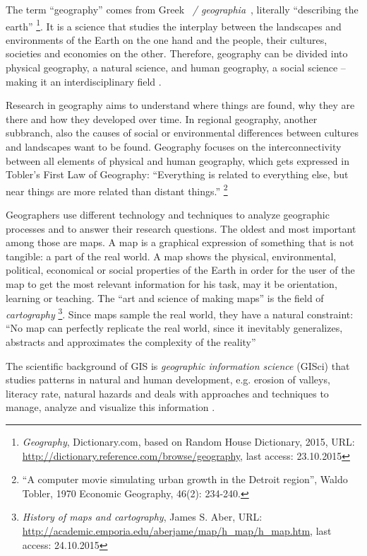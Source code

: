 The term ``geography'' comes from Greek ~\emph{\textgamma\textepsilon\textomega\textgamma\textrho\textalpha\textphi\textiota\textalpha / geographia}~, literally ``describing the earth''
\footnote{
  \textit{Geography},
  Dictionary.com, based on Random House Dictionary, 2015,
  URL: \url{http://dictionary.reference.com/browse/geography},
  last access: 23.10.2015
}.
It is a science that studies the interplay between the landscapes and environments of the Earth on the one hand and the people, their cultures, societies and economies on the other. Therefore, geography can be divided into physical geography, a natural science, and human geography, a social science -- making it an interdisciplinary field
\cite{rgsGeography}.

Research in geography aims to understand where things are found, why they are there and how they developed over time. In regional geography, another subbranch, also the causes of social or environmental differences between cultures and landscapes want to be found. Geography focuses on the interconnectivity between all elements of physical and human geography, which gets expressed in Tobler's First Law of Geography: ``Everything is related to everything else, but near things are more related than distant things.''
\footnote{
  ``A computer movie simulating urban growth in the Detroit region'',
  Waldo Tobler, 1970
  Economic Geography, 46(2): 234-240.
}

Geographers use different technology and techniques to analyze geographic processes and to answer their research questions. The oldest and most important among those are maps. A map is a graphical expression of something that is not tangible: a part of the real world. A map shows the physical, environmental, political, economical or social properties of the Earth in order for the user of the map to get the most relevant information for his task, may it be orientation, learning or teaching. The ``art and science of making maps'' is the field of \emph{cartography}
\footnote{
  \textit{History of maps and cartography},
  James S. Aber,
  URL: \url{http://academic.emporia.edu/aberjame/map/h_map/h_map.htm},
  last access: 24.10.2015
}. Since maps sample the real world, they have a natural constraint: ``No map can perfectly replicate the real world, since it inevitably generalizes, abstracts and approximates the complexity of the reality''
\cite[p. 181]{knowles2008placing}

The scientific background of GIS is \emph{geographic information science} (GISci) that studies patterns in natural and human development, e.g. erosion of valleys, literacy rate, natural hazards and deals with approaches and techniques to manage, analyze and visualize this information
\cite{ngGeography}.


